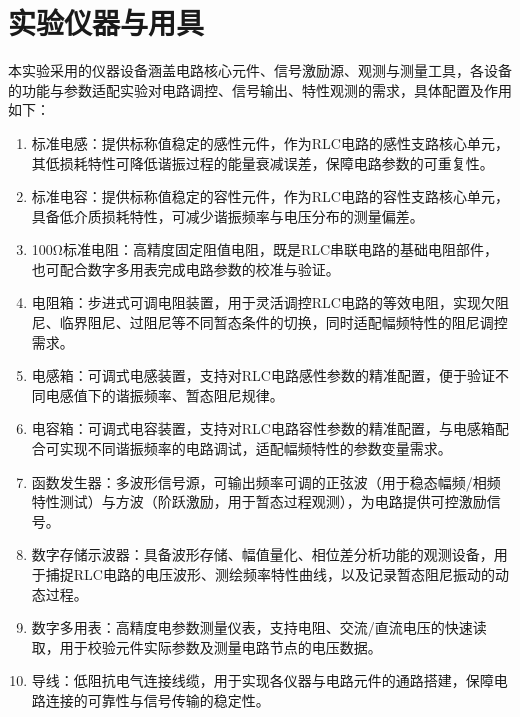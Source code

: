 \documentclass[11pt]{article}
\begin{document}
\section{实验仪器与用具}
本实验采用的仪器设备涵盖电路核心元件、信号激励源、观测与测量工具，各设备的功能与参数适配实验对电路调控、信号输出、特性观测的需求，具体配置及作用如下：
\begin{enumerate}
    \item 标准电感：提供标称值稳定的感性元件，作为RLC电路的感性支路核心单元，其低损耗特性可降低谐振过程的能量衰减误差，保障电路参数的可重复性。
    
    \item 标准电容：提供标称值稳定的容性元件，作为RLC电路的容性支路核心单元，具备低介质损耗特性，可减少谐振频率与电压分布的测量偏差。
    
    \item 100Ω标准电阻：高精度固定阻值电阻，既是RLC串联电路的基础电阻部件，也可配合数字多用表完成电路参数的校准与验证。
    
    \item 电阻箱：步进式可调电阻装置，用于灵活调控RLC电路的等效电阻，实现欠阻尼、临界阻尼、过阻尼等不同暂态条件的切换，同时适配幅频特性的阻尼调控需求。
    
    \item 电感箱：可调式电感装置，支持对RLC电路感性参数的精准配置，便于验证不同电感值下的谐振频率、暂态阻尼规律。
    
    \item 电容箱：可调式电容装置，支持对RLC电路容性参数的精准配置，与电感箱配合可实现不同谐振频率的电路调试，适配幅频特性的参数变量需求。
    
    \item 函数发生器：多波形信号源，可输出频率可调的正弦波（用于稳态幅频/相频特性测试）与方波（阶跃激励，用于暂态过程观测），为电路提供可控激励信号。
    
    \item 数字存储示波器：具备波形存储、幅值量化、相位差分析功能的观测设备，用于捕捉RLC电路的电压波形、测绘频率特性曲线，以及记录暂态阻尼振动的动态过程。
    
    \item 数字多用表：高精度电参数测量仪表，支持电阻、交流/直流电压的快速读取，用于校验元件实际参数及测量电路节点的电压数据。
    
    \item 导线：低阻抗电气连接线缆，用于实现各仪器与电路元件的通路搭建，保障电路连接的可靠性与信号传输的稳定性。
\end{enumerate}
\end{document}
